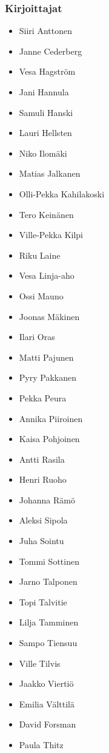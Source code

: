 \subsubsection*{Kirjoittajat}
\begin{multicols}{2}
\begin{itemize}
\item Siiri Anttonen
\item Janne Cederberg
\item Vesa Hagström
\item Jani Hannula
\item Samuli Hanski
\item Lauri Hellsten
\item Niko Ilomäki
\item Matias Jalkanen
\item Olli-Pekka Kahilakoski
\item Tero Keinänen
\item Ville-Pekka Kilpi
\item Riku Laine
\item Vesa Linja-aho
\item Ossi Mauno
\item Joonas Mäkinen
\item Ilari Oras
\item Matti Pajunen
\item Pyry Pakkanen
\item Pekka Peura
\item Annika Piiroinen
\item Kaisa Pohjoinen
\item Antti Rasila
\item Henri Ruoho
\item Johanna Rämö
\item Aleksi Sipola
\item Juha Sointu
\item Tommi Sottinen
\item Jarno Talponen
\item Topi Talvitie
\item Lilja Tamminen
\item Sampo Tiensuu
\item Ville Tilvis
\item Jaakko Viertiö
\item Emilia Välttilä
\item David Forsman
\item Paula Thitz
\end{itemize}
\end{multicols}

